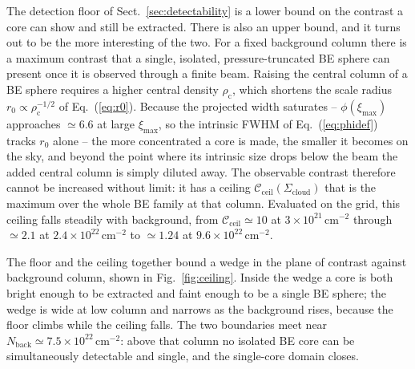 \documentclass[11pt,a4paper]{article}
\newcommand{\rhoc}{\rho_{\mathrm{c}}}
\newcommand{\rzero}{r_{0}}
\newcommand{\ximax}{\xi_{\mathrm{max}}}
\newcommand{\Scloud}{\Sigma_{\mathrm{cloud}}}
\begin{document}
The detection floor of Sect.~\ref{sec:detectability} is a lower bound on the
contrast a core can show and still be extracted. There is also an upper bound,
and it turns out to be the more interesting of the two. For a fixed background
column there is a maximum contrast that a single, isolated, pressure-truncated
BE sphere can present once it is observed through a finite beam. Raising the
central column of a BE sphere requires a higher central density $\rhoc$, which
shortens the scale radius $\rzero \propto \rhoc^{-1/2}$ of Eq.~(\ref{eq:r0}).
Because the projected width saturates -- $\phi(\ximax)$ approaches $\simeq6.6$
at large $\ximax$, so the intrinsic FWHM of Eq.~(\ref{eq:phidef}) tracks
$\rzero$ alone -- the more concentrated a core is made, the smaller it becomes
on the sky, and beyond the point where its intrinsic size drops below the beam
the added central column is simply diluted away. The observable contrast
therefore cannot be increased without limit: it has a ceiling
$\mathcal{C}_{\mathrm{ceil}}(\Scloud)$ that is the maximum over the whole BE
family at that column. Evaluated on the grid, this ceiling falls steadily with
background, from $\mathcal{C}_{\mathrm{ceil}}\simeq10$ at
$3\times10^{21}\,\mathrm{cm^{-2}}$ through $\simeq2.1$ at
$2.4\times10^{22}\,\mathrm{cm^{-2}}$ to $\simeq1.24$ at
$9.6\times10^{22}\,\mathrm{cm^{-2}}$.

The floor and the ceiling together bound a wedge in the plane of contrast
against background column, shown in Fig.~\ref{fig:ceiling}. Inside the wedge a
core is both bright enough to be extracted and faint enough to be a single BE
sphere; the wedge is wide at low column and narrows as the background rises,
because the floor climbs while the ceiling falls. The two boundaries meet near
$N_{\mathrm{back}}\simeq7.5\times10^{22}\,\mathrm{cm^{-2}}$: above that column no
isolated BE core can be simultaneously detectable and single, and the
single-core domain closes.
\end{document}
